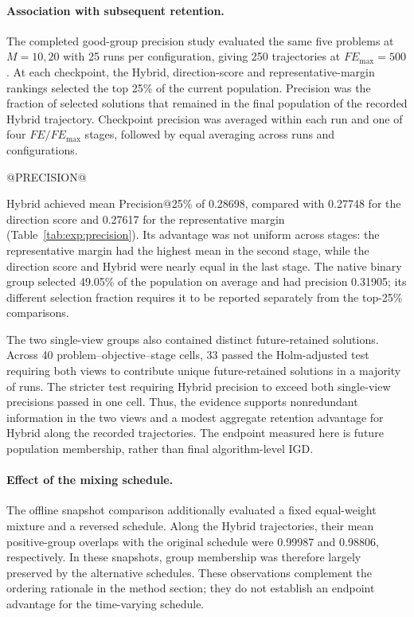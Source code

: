 \paragraph{Association with subsequent retention.}
The completed good-group precision study evaluated the same five
problems at $M=10,20$ with 25 runs per configuration, giving 250
trajectories at $FE_{\max}=500$. At each checkpoint, the Hybrid,
direction-score and representative-margin rankings selected the top
25\% of the current population. Precision was the fraction of selected
solutions that remained in the final population of the recorded Hybrid
trajectory. Checkpoint precision was averaged within each run and one
of four $FE/FE_{\max}$ stages, followed by equal averaging across runs
and configurations.

@PRECISION@

Hybrid achieved mean Precision@25\% of 0.28698, compared with 0.27748
for the direction score and 0.27617 for the representative margin
(Table~\ref{tab:exp:precision}). Its advantage was not uniform across
stages: the representative margin had the highest mean in the second
stage, while the direction score and Hybrid were nearly equal in the
last stage. The native binary group selected 49.05\% of the population
on average and had precision 0.31905; its different selection fraction
requires it to be reported separately from the top-25\% comparisons.

The two single-view groups also contained distinct future-retained
solutions. Across 40 problem--objective--stage cells, 33 passed the
Holm-adjusted test requiring both views to contribute unique
future-retained solutions in a majority of runs. The stricter test
requiring Hybrid precision to exceed both single-view precisions passed
in one cell. Thus, the evidence supports nonredundant information in the
two views and a modest aggregate retention advantage for Hybrid along
the recorded trajectories. The endpoint measured here is future
population membership, rather than final algorithm-level IGD.

\paragraph{Effect of the mixing schedule.}
The offline snapshot comparison additionally evaluated a fixed
equal-weight mixture and a reversed schedule. Along the Hybrid
trajectories, their mean positive-group overlaps with the original
schedule were 0.99987 and 0.98806, respectively. In these snapshots,
group membership was therefore largely preserved by the alternative
schedules. These observations complement the ordering rationale in the
method section; they do not establish an endpoint advantage for the
time-varying schedule.

